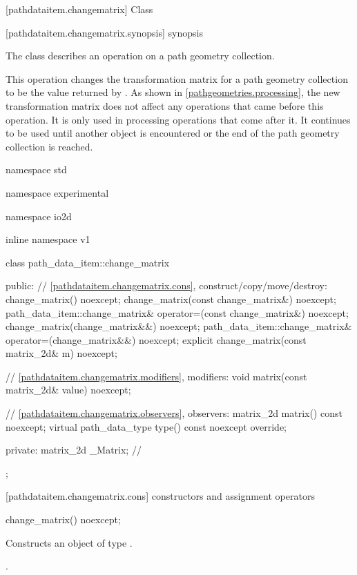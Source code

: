  [pathdataitem.changematrix] {Class }

 [pathdataitem.changematrix.synopsis] { synopsis}

\pnum
{}
The class  describes an operation on a path geometry collection.

\pnum
This operation changes the transformation matrix for a path geometry collection to be the value returned by . As shown in \ref{pathgeometries.processing}, the new transformation matrix does not affect any operations that came before this operation. It is only used in processing operations that come after it. It continues to be used until another  object is encountered or the end of the path geometry collection is reached.

\begin{codeblock}
namespace std { namespace experimental { namespace io2d { inline namespace v1 {
  class path_data_item::change_matrix {
  public:
    // \ref{pathdataitem.changematrix.cons}, construct/copy/move/destroy:
    change_matrix() noexcept;
    change_matrix(const change_matrix&) noexcept;
    path_data_item::change_matrix& operator=(const change_matrix&) noexcept;
    change_matrix(change_matrix&&) noexcept;
    path_data_item::change_matrix& operator=(change_matrix&&) noexcept;
    explicit change_matrix(const matrix_2d& m) noexcept;

    // \ref{pathdataitem.changematrix.modifiers}, modifiers:
    void matrix(const matrix_2d& value) noexcept;

    // \ref{pathdataitem.changematrix.observers}, observers:
    matrix_2d matrix() const noexcept;
    virtual path_data_type type() const noexcept override;
    
  private:
    matrix_2d _Matrix; // \expos
  };
} } } }
\end{codeblock}

 [pathdataitem.changematrix.cons] { constructors and assignment operators}

\begin{itemdecl}
    change_matrix() noexcept;
\end{itemdecl}
\begin{itemdescr}
	\pnum
	\effects
	Constructs an object of type .
	
	\pnum
	\postconditions
	.
\end{itemdescr}

